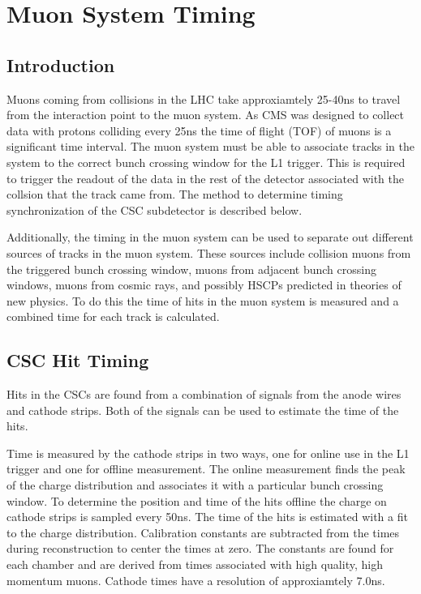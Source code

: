 \chapter{Muon System Timing \label{sec:timing}}

\section{Introduction}
Muons coming from collisions in the LHC take approxiamtely 25-40ns to travel from the interaction point to the muon system. As CMS was designed to collect data with protons
colliding every 25ns the time of flight (TOF) of muons is a significant time interval. The muon system must be able to associate tracks in the system to the
correct bunch crossing window for the L1 trigger.
This is required to trigger the readout of the data in the rest of the detector associated with the collsion that the track came from.
The method to determine timing synchronization of the CSC subdetector is described below.

Additionally, the timing in the muon system can be used to separate out different sources of tracks in the muon system. These sources include collision muons from the
triggered bunch crossing window, muons from adjacent bunch crossing windows, muons from cosmic rays, and possibly 
HSCPs predicted in theories of new physics. To do this the time of hits in the muon system is measured and a combined time for each track is calculated.

\section{CSC Hit Timing}
Hits in the CSCs are found from a combination of signals from the anode wires and cathode strips. Both of the signals can be used to estimate the time of the hits.

Time is measured by the cathode strips in two ways, one for online use in the L1 trigger and one for offline measurement. The online measurement finds the peak of the
charge distribution and associates it with a particular bunch crossing window. To determine the position and time of the hits offline the charge on cathode strips is sampled every 50ns.
The time of the hits is estimated with a fit to the charge distribution. Calibration constants are subtracted from the times during reconstruction to center the times at zero.
The constants are found for each chamber and are derived from times associated with high quality, high momentum muons. Cathode times have a resolution of approxiamtely 7.0ns.

